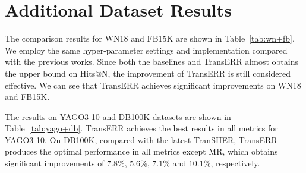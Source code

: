 \documentclass[11pt]{article}
\begin{document}
\section{Additional Dataset Results}\label{app-d}


The comparison results for WN18 and FB15K are shown in Table~\ref{tab:wn+fb}. We employ the same hyper-parameter settings and implementation compared with the previous works.  Since both the baselines and TransERR almost obtains the upper bound on Hits@N, the improvement of TransERR is still considered effective. We can see that TransERR achieves significant improvements on WN18 and FB15K.


The results on YAGO3-10 and DB100K datasets are shown in Table~\ref{tab:yago+db}. TransERR achieves the best results in all metrics for YAGO3-10. On DB100K, compared with the latest TranSHER, TransERR produces the optimal performance in all metrics except MR, which obtains significant improvements of $7.8\%$, $5.6\%$, $7.1\%$ and $10.1\%$, respectively.
\end{document}
